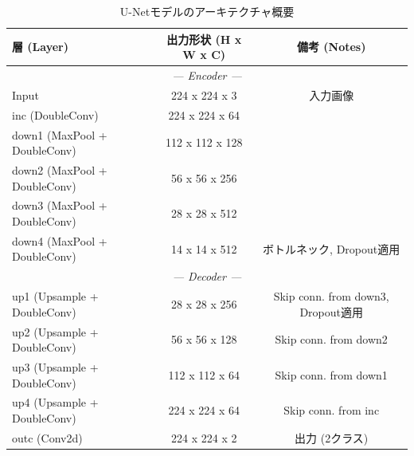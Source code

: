 \documentclass[10pt, a4paper, twocolumn]{jarticle}
\begin{document}
\begin{table}[htb]
  \centering
  \caption{U-Netモデルのアーキテクチャ概要}
  \label{tab:unet_architecture}
  \begin{tabular}{lcc}
    \toprule
    \textbf{層 (Layer)} & \textbf{出力形状 (H x W x C)} & \textbf{備考 (Notes)} \\
    \midrule
    \multicolumn{3}{c}{\textit{--- Encoder ---}} \\
    Input & 224 x 224 x 3 & 入力画像 \\
    inc (DoubleConv) & 224 x 224 x 64 & \\
    down1 (MaxPool + DoubleConv) & 112 x 112 x 128 & \\
    down2 (MaxPool + DoubleConv) & 56 x 56 x 256 & \\
    down3 (MaxPool + DoubleConv) & 28 x 28 x 512 & \\
    down4 (MaxPool + DoubleConv) & 14 x 14 x 512 & ボトルネック, Dropout適用 \\
    \midrule
    \multicolumn{3}{c}{\textit{--- Decoder ---}} \\
    up1 (Upsample + DoubleConv) & 28 x 28 x 256 & Skip conn. from down3, Dropout適用 \\
    up2 (Upsample + DoubleConv) & 56 x 56 x 128 & Skip conn. from down2 \\
    up3 (Upsample + DoubleConv) & 112 x 112 x 64 & Skip conn. from down1 \\
    up4 (Upsample + DoubleConv) & 224 x 224 x 64 & Skip conn. from inc \\
  \midrule
  outc (Conv2d) & 224 x 224 x 2 & 出力 (2クラス) \\
  \bottomrule
  \end{tabular}
\end{table}
\end{document}
